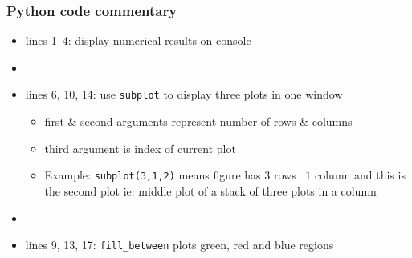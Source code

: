 \documentclass[english,14pt]{beamer}
\newcommand\red[1]{{\color{red} #1}}
\newcommand\blue[1]{{\color{blue} #1}}
\newcommand\darkGreen[1]{{\color{darkGreen} #1}}
\begin{document}

\begin{frame}[fragile]

\frametitle{Python code commentary}

\begin{itemize}
	\item lines 1--4: display numerical results on console
	\item[]
	\item lines 6, 10, 14: use \texttt{subplot} to display three plots in one window
	
	\begin{itemize}
		\item first \& second arguments represent number of rows \& columns
		\item third argument is index of current plot
		\item Example: \texttt{subplot(3,1,2)} means figure has $3$ rows \, $1$ column and this is the second plot ie: middle plot of a stack of three plots in a column
	\end{itemize}

	\item[]
	\item lines 9, 13, 17: \texttt{fill\_between} plots \darkGreen{green}, \red{red} and \blue{blue} regions
\end{itemize}

\end{frame}

%
%
%
%
%
%
%
%
%
%
%
\end{document}
